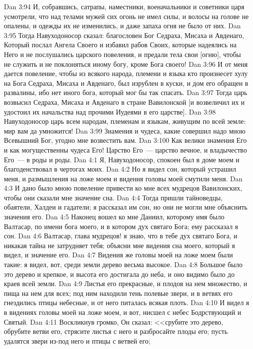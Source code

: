 \vs Dan 3:94 И, собравшись, сатрапы, наместники, военачальники и советники царя усмотрели, что над телами мужей сих огонь не имел силы, и волосы на голове не опалены, и одежды их не изменились, и даже запаха огня не было от них.
\vs Dan 3:95 Тогда Навуходоносор сказал: благословен Бог Седраха, Мисаха и Авденаго, Который послал Ангела Своего и избавил рабов Своих, которые надеялись на Него и не послушались царского повеления, и предали тела свои [огню], чтобы не служить и не поклоняться иному богу, кроме Бога своего!
\vs Dan 3:96 И от меня дается повеление, чтобы из всякого народа, племени и языка кто произнесет хулу на Бога Седраха, Мисаха и Авденаго, был изрублен в куски, и дом его обращен в развалины, ибо нет иного бога, который мог бы так спасать.
\vs Dan 3:97 Тогда царь возвысил Седраха, Мисаха и Авденаго в стране Вавилонской [и возвеличил их и удостоил их начальства над прочими Иудеями в его царстве].
\rsbpar\vs Dan 3:98 Навуходоносор царь всем народам, племенам и языкам, живущим по всей земле: мир вам да умножится!
\vs Dan 3:99 Знамения и чудеса, какие совершил надо мною Всевышний Бог, угодно мне возвестить вам.
\vs Dan 3:100 Как велики знамения Его и как могущественны чудеса Его! Царство Его~--- царство вечное, и владычество Его~--- в роды и роды.
\vs Dan 4:1 Я, Навуходоносор, спокоен был в доме моем и благоденствовал в чертогах моих.
\vs Dan 4:2 Но я видел сон, который устрашил меня, и размышления на ложе моем и видения головы моей смутили меня.
\vs Dan 4:3 И дано было мною повеление привести ко мне всех мудрецов Вавилонских, чтобы они сказали мне значение сна.
\vs Dan 4:4 Тогда пришли тайноведцы, обаятели, Халдеи и гадатели; я рассказал им сон, но они не могли мне объяснить значения его.
\vs Dan 4:5 Наконец вошел ко мне Даниил, которому имя было Валтасар, по имени бога моего, и в котором дух святаго Бога; ему рассказал я сон.
\vs Dan 4:6 Валтасар, глава мудрецов! я знаю, что в тебе дух святаго Бога, и никакая тайна не затрудняет тебя; объясни мне видения сна моего, который я видел, и значение его.
\vs Dan 4:7 Видения же головы моей на ложе моем были такие: я видел, вот, среди земли дерево весьма высокое.
\vs Dan 4:8 Большое было это дерево и крепкое, и высота его достигала до неба, и оно видимо было до краев всей земли.
\vs Dan 4:9 Листья его прекрасные, и плодов на нем множество, и пища на нем для всех; под ним находили тень полевые звери, и в ветвях его гнездились птицы небесные, и от него питалась всякая плоть.
\vs Dan 4:10 И видел я в видениях головы моей на ложе моем, и вот, нисшел с небес Бодрствующий и Святый.
\vs Dan 4:11 Воскликнув громко, Он сказал: <<срубите это дерево, обрубите ветви его, стрясите листья с него и разбросайте плоды его; пусть удалятся звери из-под него и птицы с ветвей его;
